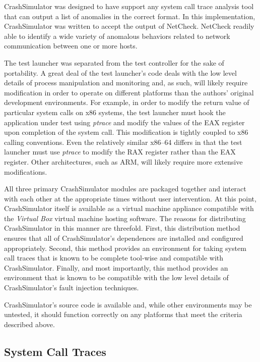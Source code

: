         CrashSimulator was designed to have support any system call trace analysis tool that can output a list of
        anomalies in the correct format. In this implementation, CrashSimulator was written to accept the output of
        NetCheck. NetCheck readily able to identify a wide variety of anomalous behaviors related to network
        communication between one or more hosts.

        The test launcher was separated from the test controller for the sake of portability. A great deal of the test
        launcher's code deals with the low level details of process manipulation and monitoring and, as such, will
        likely require modification in order to operate on different platforms than the authors' original development
        environments. For example, in order to modify the return value of particular system calls on x86 systems, the
        test launcher must hook the application under test using \emph{ptrace} and modify the values of the EAX register
        upon completion of the system call. This modification is tightly coupled to x86 calling conventions. Even the
        relatively similar x86--64 differs in that the test launcher must use \emph{ptrace} to modify the RAX register
        rather than the EAX register. Other architectures, such as ARM, will likely require more extensive
        modifications.

        All three primary CrashSimulator modules are packaged together and interact with each other at the appropriate
        times without user intervention. At this point, CrashSimulator itself is available as a virtual machine
        appliance compatible with the \emph{Virtual Box} virtual machine hosting software. The reasons for distributing
        CrashSimulator in this manner are threefold. First, this distribution method ensures that all of
        CrashSimulator's dependences are installed and configured appropriately. Second, this method provides an
        environment for taking system call traces that is known to be complete tool-wise and compatible with
        CrashSimulator. Finally, and most importantly, this method provides an environment that is known to be
        compatible with the low level details of CrashSimulator's fault injection techniques.

        CrashSimulator's source code is available and, while other environments may be untested, it should function
        correctly on any platforms that meet the criteria described above.

    \subsection{System Call Traces}

